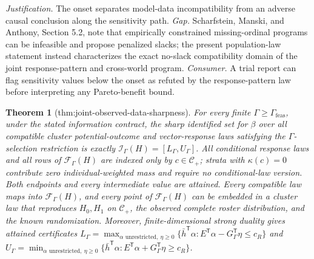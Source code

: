 \documentclass{article}
\newtheorem{theorem}{Theorem}
\begin{document}
\par\smallskip\noindent \textit{Justification.} The onset separates model-data incompatibility from an adverse causal conclusion along the sensitivity path. \textit{Gap.} Scharfstein, Manski, and Anthony, Section 5.2, note that empirically constrained missing-ordinal programs can be infeasible and propose penalized slacks; the present population-law statement instead characterizes the exact no-slack compatibility domain of the joint response-pattern and cross-world program. \textit{Consumer.} A trial report can flag sensitivity values below the onset as refuted by the response-pattern law before interpreting any Pareto-benefit bound.

\begin{theorem}[thm:joint-observed-data-sharpness]\label{thm:joint-observed-data-sharpness}
For every finite \(\Gamma\ge\Gamma_{\mathrm{feas}}\), under the stated information contract, the sharp identified set for \(\beta\) over all compatible cluster potential-outcome and vector-response laws satisfying the \(\Gamma\)-selection restriction is exactly \(\mathcal I_{\Gamma}(H)=[L_{\Gamma},U_{\Gamma}]\). All conditional response laws and all rows of \(\mathcal F_{\Gamma}(H)\) are indexed only by \(c\in\mathcal C_{+}\); strata with \(\kappa(c)=0\) contribute zero individual-weighted mass and require no conditional-law version. Both endpoints and every intermediate value are attained. Every compatible law maps into \(\mathcal F_{\Gamma}(H)\), and every point of \(\mathcal F_{\Gamma}(H)\) can be embedded in a cluster law that reproduces \(H_0,H_1\) on \(\mathcal C_{+}\), the observed complete roster distribution, and the known randomization. Moreover, finite-dimensional strong duality gives attained certificates \(L_{\Gamma}=\max_{\alpha\text{ unrestricted},\ \eta\ge0}\{\bar h^{\mathsf T}\alpha:E^{\mathsf T}\alpha-G_{\Gamma}^{\mathsf T}\eta\le c_R\}\) and \(U_{\Gamma}=\min_{\alpha\text{ unrestricted},\ \eta\ge0}\{\bar h^{\mathsf T}\alpha:E^{\mathsf T}\alpha+G_{\Gamma}^{\mathsf T}\eta\ge c_R\}\).
\end{theorem}
\end{document}
